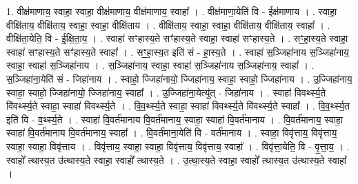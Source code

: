\documentclass[17pt]{extarticle}
\begin{document}
1. वीक्ष॑माणाय॒ स्वाहा॒ स्वाहा॒ वीक्ष॑माणाय॒ वीक्ष॑माणाय॒ स्वाहा᳚ । . वीक्ष॑माणा॒येति॑ वि - ईक्ष॑माणाय । . स्वाहा॒ वीक्षि॑ताय॒ वीक्षि॑ताय॒ स्वाहा॒ स्वाहा॒ वीक्षि॑ताय । . वीक्षि॑ताय॒ स्वाहा॒ स्वाहा॒ वीक्षि॑ताय॒ वीक्षि॑ताय॒ स्वाहा᳚ । . वीक्षि॑ता॒येति॒ वि - ई॒क्षि॒ता॒य॒ । . स्वाहा॑ सꣳहास्य॒ते सꣳ॑हास्य॒ते स्वाहा॒ स्वाहा॑ सꣳहास्य॒ते । . सꣳ॒॒हा॒स्य॒ते स्वाहा॒ स्वाहा॑ सꣳहास्य॒ते सꣳ॑हास्य॒ते स्वाहा᳚ । . सꣳ॒॒हा॒स्य॒त इति॑ सं - हा॒स्य॒ते । . स्वाहा॑ स॒ञ्जिहा॑नाय स॒ञ्जिहा॑नाय॒ स्वाहा॒ स्वाहा॑ स॒ञ्जिहा॑नाय । . स॒ञ्जिहा॑नाय॒ स्वाहा॒ स्वाहा॑ स॒ञ्जिहा॑नाय स॒ञ्जिहा॑नाय॒ स्वाहा᳚ । . स॒ञ्जिहा॑ना॒येति॑ सं - जिहा॑नाय । . स्वाहो॒ ज्जिहा॑नायो॒ ज्जिहा॑नाय॒ स्वाहा॒ स्वाहो॒ ज्जिहा॑नाय । . उ॒ज्जिहा॑नाय॒ स्वाहा॒ स्वाहो॒ ज्जिहा॑नायो॒ ज्जिहा॑नाय॒ स्वाहा᳚ । . उ॒ज्जिहा॑ना॒येत्यु॑त् - जिहा॑नाय । . स्वाहा॑ विवर्थ्स्य॒ते वि॑वर्थ्स्य॒ते स्वाहा॒ स्वाहा॑ विवर्थ्स्य॒ते । . वि॒व॒र्थ्स्य॒ते स्वाहा॒ स्वाहा॑ विवर्थ्स्य॒ते वि॑वर्थ्स्य॒ते स्वाहा᳚ । . वि॒व॒र्थ्स्य॒त इति॑ वि - व॒र्थ्स्य॒ते । . स्वाहा॑ वि॒वर्त॑मानाय वि॒वर्त॑मानाय॒ स्वाहा॒ स्वाहा॑ वि॒वर्त॑मानाय । . वि॒वर्त॑मानाय॒ स्वाहा॒ स्वाहा॑ वि॒वर्त॑मानाय वि॒वर्त॑मानाय॒ स्वाहा᳚ । . वि॒वर्त॑माना॒येति॑ वि - वर्त॑मानाय । . स्वाहा॒ विवृ॑त्ताय॒ विवृ॑त्ताय॒ स्वाहा॒ स्वाहा॒ विवृ॑त्ताय । . विवृ॑त्ताय॒ स्वाहा॒ स्वाहा॒ विवृ॑त्ताय॒ विवृ॑त्ताय॒ स्वाहा᳚ । . विवृ॑त्ता॒येति॒ वि - वृ॒त्ता॒य॒ । . स्वाहो᳚ त्थास्य॒त उ॑त्थास्य॒ते स्वाहा॒ स्वाहो᳚ त्थास्य॒ते । . उ॒त्था॒स्य॒ते स्वाहा॒ स्वाहो᳚ त्थास्य॒त उ॑त्थास्य॒ते स्वाहा᳚ । \newline
\end{document}
